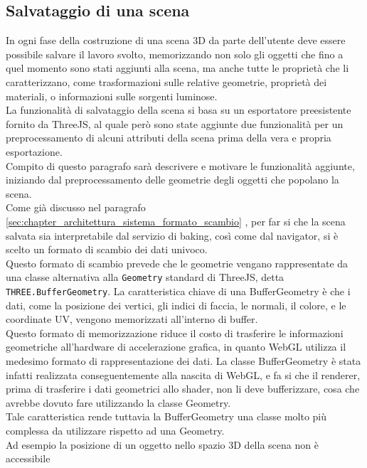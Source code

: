 \subsection{Salvataggio di una scena}
\label{sec:chapter_creazione_scena_funzionalita_editor_salvataggio_scena}
In ogni fase della costruzione di una scena 3D da parte dell’utente deve essere possibile salvare il lavoro svolto, memorizzando non solo gli oggetti che fino a quel momento sono stati aggiunti alla scena, ma anche tutte le proprietà che li caratterizzano, come trasformazioni sulle relative geometrie, proprietà dei materiali, o informazioni sulle sorgenti luminose. 
\\
La funzionalità di salvataggio della scena si basa su un esportatore preesistente fornito da ThreeJS, al quale però sono state aggiunte due funzionalità per un preprocessamento di alcuni attributi della scena prima della vera e propria esportazione.
\\
Compito di questo paragrafo sarà descrivere e motivare le funzionalità aggiunte, iniziando dal preprocessamento delle geometrie degli oggetti che popolano la scena.
\\
Come già discusso nel paragrafo \ref{sec:chapter_architettura_sistema_formato_scambio} , per far si che la scena salvata sia interpretabile dal servizio di baking, così come dal navigator, si è scelto un formato di scambio dei dati univoco.
\\ 
Questo formato di scambio prevede che le geometrie vengano rappresentate da una classe alternativa alla \texttt{Geometry} standard di ThreeJS, detta \texttt{THREE.BufferGeometry}.
La caratteristica chiave di una BufferGeometry è che i dati, come la posizione dei vertici, gli indici di faccia, le normali, il colore, e le coordinate UV, vengono memorizzati all’interno di buffer. 
\\
Questo formato di memorizzazione riduce il costo di trasferire le informazioni geometriche all’hardware di accelerazione grafica, in quanto WebGL utilizza il medesimo formato di rappresentazione dei dati. La classe BufferGeometry è stata infatti realizzata conseguentemente alla nascita di WebGL, e fa si che il renderer, prima di trasferire i dati geometrici allo shader, non li deve bufferizzare, cosa che avrebbe dovuto fare utilizzando la classe Geometry.
\\
Tale caratteristica rende tuttavia la BufferGeometry una classe molto più complessa da utilizzare rispetto ad una Geometry.
\\
Ad esempio la posizione di un oggetto nello spazio 3D della scena non è accessibile

